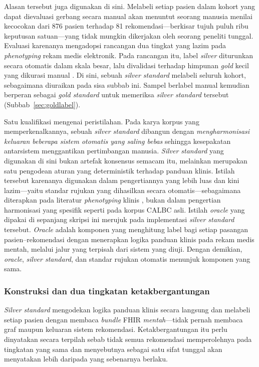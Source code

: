 Alasan tersebut juga digunakan di sini. Melabeli setiap pasien dalam kohort yang dapat
dievaluasi gerbang secara manual akan menuntut seorang manusia menilai kecocokan dari 876
pasien terhadap 81 rekomendasi---berkisar tujuh puluh ribu keputusan
satuan---yang tidak mungkin dikerjakan oleh seorang peneliti tunggal. Evaluasi karenanya mengadopsi rancangan dua tingkat yang lazim pada \emph{phenotyping} rekam
medis elektronik. Pada rancangan itu, label \emph{silver} diturunkan secara otomatis dalam
skala besar, lalu divalidasi terhadap himpunan \emph{gold} kecil yang dikurasi manual
\cite{nogues2022}. Di sini, sebuah \emph{silver standard} melabeli seluruh kohort,
sebagaimana diuraikan pada sisa subbab ini. Sampel berlabel manual kemudian berperan sebagai
\emph{gold standard} untuk memeriksa \emph{silver standard} tersebut
(Subbab~\ref{sec:goldlabel}).

Satu kualifikasi mengenai peristilahan. Pada karya korpus yang memperkenalkannya, sebuah
\emph{silver standard} dibangun dengan \emph{mengharmonisasi keluaran beberapa sistem otomatis
yang saling bebas} sehingga kesepakatan antarsistem menggantikan pertimbangan manusia.
\emph{Silver standard} yang digunakan di sini bukan artefak konsensus semacam itu, melainkan
merupakan satu pengodean aturan yang deterministik terhadap panduan klinis. Istilah tersebut karenanya
digunakan dalam pengertiannya yang lebih luas dan kini lazim---yaitu standar rujukan yang
dihasilkan secara otomatis---sebagaimana diterapkan pada literatur \emph{phenotyping} klinis
\cite{nogues2022}, bukan dalam pengertian harmonisasi yang spesifik seperti pada korpus CALBC asli.
Istilah \emph{oracle} yang dipakai di sepanjang skripsi ini merujuk pada implementasi
\emph{silver standard} tersebut. \emph{Oracle} adalah komponen yang menghitung label bagi setiap
pasangan pasien--rekomendasi dengan menerapkan logika panduan klinis pada rekam medis mentah,
melalui jalur yang terpisah dari sistem yang diuji. Dengan demikian, \emph{oracle},
\emph{silver standard}, dan standar rujukan otomatis menunjuk komponen yang sama.

\subsubsection*{Konstruksi dan dua tingkatan ketakbergantungan}
\emph{Silver standard} mengodekan logika panduan klinis secara langsung dan melabeli setiap pasien
dengan membaca \emph{bundle} FHIR \emph{mentah}---tidak pernah membaca graf maupun keluaran
sistem rekomendasi. Ketakbergantungan itu perlu dinyatakan secara terpilah sebab tidak semua
rekomendasi memperolehnya pada tingkatan yang sama dan menyebutnya sebagai satu sifat tunggal
akan menyatakan lebih daripada yang sebenarnya berlaku.

